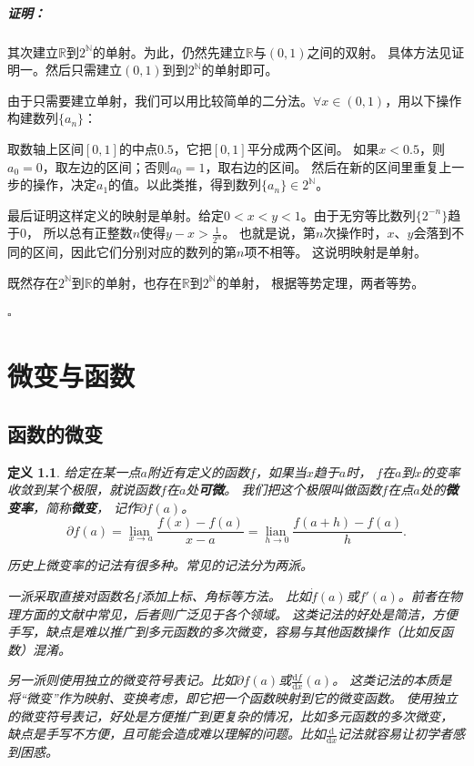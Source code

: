 \documentclass[12pt,UTF8]{ctexbook}
\newcommand{\lian}[1]{
    \underset{#1}{\operatorname{lian}\,}
}
\renewenvironment{proof}{\paragraph{\textbf{证明：}}}{\hfill$\square$}
\newtheorem{df}{定义}[section]
\begin{document}
\begin{appendix}
\begin{proof}
    其次建立$\mathbb{R}$到$2^\mathbb{N}$的单射。为此，仍然先建立$\mathbb{R}$与$(0,1)$之间的双射。
    具体方法见证明一。然后只需建立$(0,1)$到到$2^\mathbb{N}$的单射即可。

    由于只需要建立单射，我们可以用比较简单的二分法。$\forall x \in (0,1)$，用以下操作构建数列$\{a_n\}$：
    
    取数轴上区间$[0,1]$的中点$0.5$，它把$[0,1]$平分成两个区间。
    如果$x<0.5$，则$a_0=0$，取左边的区间；否则$a_0=1$，取右边的区间。
    然后在新的区间里重复上一步的操作，决定$a_1$的值。以此类推，得到数列$\{a_n\}\in 2^\mathbb{N}$。

    最后证明这样定义的映射是单射。给定$0 < x < y < 1$。由于无穷等比数列$\{2^{-n}\}$趋于$0$，
    所以总有正整数$n$使得$y - x > \frac{1}{2^n}$。
    也就是说，第$n$次操作时，$x$、$y$会落到不同的区间，因此它们分别对应的数列的第$n$项不相等。
    这说明映射是单射。

    既然存在$2^\mathbb{N}$到$\mathbb{R}$的单射，也存在$\mathbb{R}$到$2^\mathbb{N}$的单射，
    根据等势定理，两者等势。

\end{proof}

\chapter{微变与函数}

\section{函数的微变}

\begin{df}\label{df:b-1-0}
给定在某一点$a$附近有定义的函数$f$，如果当$x$趋于$a$时，
$f$在$a$到$x$的变率收敛到某个极限，就说函数$f$在$a$处\textbf{可微}。
我们把这个极限叫做函数$f$在点$a$处的\textbf{微变率}，简称\textbf{微变}，
记作$\partial f(a)$。
$$ \partial f(a) = \lian{x\to a} \frac{f(x) - f(a)}{x - a} = \lian{h\to 0} \frac{f(a + h) - f(a)}{h}.$$

历史上微变率的记法有很多种。常见的记法分为两派。

一派采取直接对函数名$f$添加上标、角标等方法。
比如$\dot{f}(a)$或$f'(a)$。前者在物理方面的文献中常见，后者则广泛见于各个领域。
这类记法的好处是简洁，方便手写，缺点是难以推广到多元函数的多次微变，容易与其他函数操作（比如反函数）混淆。

另一派则使用独立的微变符号表记。比如$\partial f(a)$或$\frac{\mathrm{d}f}{\mathrm{d}x}(a)$。
这类记法的本质是将“微变”作为映射、变换考虑，即它把一个函数映射到它的微变函数。
使用独立的微变符号表记，好处是方便推广到更复杂的情况，比如多元函数的多次微变，
缺点是手写不方便，且可能会造成难以理解的问题。比如$\frac{\mathrm{d}}{\mathrm{d}x}$记法就容易让初学者感到困惑。


\end{df}
\end{appendix}
\end{document}
